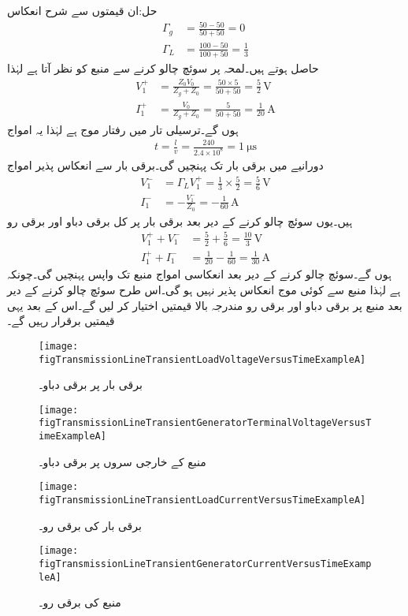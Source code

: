حل:ان قیمتوں سے شرح انعکاس
\begin{align*}
\Gamma_g&=\frac{50-50}{50+50}=0\\
\Gamma_L&=\frac{100-50}{100+50}=\frac{1}{3}
\end{align*}
حاصل ہوتے ہیں۔لمحہ  پر سوئچ چالو کرنے سے منبع کو  نظر آتا ہے لہٰذا
\begin{align*}
V_1^+&=\frac{Z_0 V_0}{Z_g+Z_0}=\frac{50 \times 5}{50+50}=\frac{5}{2} \, \si{\volt}\\
I_1^+&=\frac{V_0}{Z_g+Z_0}=\frac{5}{50+50}=\frac{1}{20} \, \si{\ampere}
\end{align*}
ہوں گے۔ترسیلی تار میں رفتار موج  ہے لہٰذا یہ امواج 
\begin{align*}
t=\frac{l}{v}=\frac{240}{2.4 \times 10^8}=\SI{1}{\micro\second}
\end{align*}
دورانیے میں برقی بار تک پہنچیں گی۔برقی بار سے انعکاس پذیر امواج
\begin{align*}
V_1^-&=\Gamma_L V_1^+=\frac{1}{3} \times \frac{5}{2}=\frac{5}{6} \, \si{\volt}\\
I_1^-&=-\frac{V_1^-}{Z_0}=-\frac{1}{60} \, \si{\ampere}
\end{align*}
ہیں۔یوں سوئچ چالو کرنے کے  دیر بعد برقی بار پر کل برقی دباو اور برقی رو 
\begin{align*}
V_1^+ + V_1^- &=\frac{5}{2}+\frac{5}{6}=\frac{10}{3} \, \si{\volt}\\
I_1^+ + I_1^-&=\frac{1}{20}-\frac{1}{60}=\frac{1}{30} \, \si{\ampere}
\end{align*}
ہوں گے۔سوئچ چالو کرنے کے  دیر بعد انعکاسی امواج منبع تک واپس پہنچیں گی۔چونکہ  ہے لہٰذا منبع سے کوئی موج انعکاس پذیر نہیں ہو گی۔اس طرح سوئچ چالو کرنے کے  دیر بعد منبع پر برقی دباو اور برقی رو مندرجہ بالا قیمتیں اختیار کر لیں گے۔اس کے بعد یہی قیمتیں برقرار رہیں گے۔
\begin{figure}
\centering
\texttt{[image: figTransmissionLineTransientLoadVoltageVersusTimeExampleA]}
\caption{برقی بار پر برقی دباو۔}
\label{شکل_ترسیلی_مثال_بار_دباو}
\end{figure}
%
\begin{figure}
\centering
\texttt{[image: figTransmissionLineTransientGeneratorTerminalVoltageVersusTimeExampleA]}
\caption{منبع کے خارجی سروں پر برقی دباو۔}
\label{شکل_ترسیلی_مثال_منبع_دباو}
\end{figure}
%
\begin{figure}
\centering
\texttt{[image: figTransmissionLineTransientLoadCurrentVersusTimeExampleA]}
\caption{برقی بار کی برقی رو۔}
\label{شکل_ترسیلی_مثال_بار_رو}
\end{figure}
%
\begin{figure}
\centering
\texttt{[image: figTransmissionLineTransientGeneratorCurrentVersusTimeExampleA]}
\caption{منبع کی برقی رو۔}
\label{شکل_ترسیلی_مثال_منبع_رو}
\end{figure}

